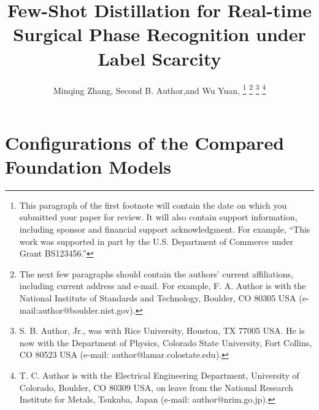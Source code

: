 \documentclass[journal,twoside,web]{ieeecolor}
\begin{document}
\title{Few-Shot Distillation for Real-time Surgical Phase Recognition under Label Scarcity}

\author{Minqing Zhang, Second B. Author,and Wu Yuan,  
\thanks{This paragraph of the first footnote will contain the date on which
you submitted your paper for review. It will also contain support information,
including sponsor and financial support acknowledgment. For example, 
``This work was supported in part by the U.S. Department of Commerce under Grant BS123456.'' }
\thanks{The next few paragraphs should contain the authors' current affiliations,
including current address and e-mail. For example, F. A. Author is with the
National Institute of Standards and Technology, Boulder, CO 80305 USA (e-mail:author@boulder.nist.gov). }
\thanks{S. B. Author, Jr., was with Rice University, Houston, TX 77005 USA.
He is now with the Department of Physics, Colorado State University,
Fort Collins, CO 80523 USA (e-mail: author@lamar.colostate.edu).}
\thanks{T. C. Author is with the Electrical Engineering Department,
University of Colorado, Boulder, CO 80309 USA, on leave from the National
Research Institute for Metals, Tsukuba, Japan (e-mail: author@nrim.go.jp).}}

\maketitle














\appendices

\section{Configurations of the Compared Foundation Models}
\label{app:vfm_config}




\end{document}
